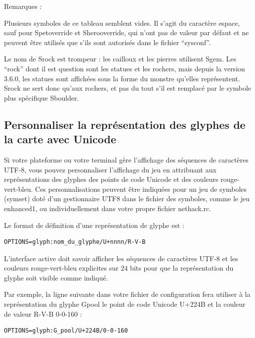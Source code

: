 \documentclass[titlepage]{article}
\begin{document}
Remarques :

Plusieurs symboles de ce tableau semblent vides.
Il s'agit du caractère espace, sauf pour S\textunderscore pet\textunderscore override
et S\textunderscore hero\textunderscore override, qui n'ont pas de valeur par défaut
et ne peuvent être utilisés que s'ils sont autorisés dans le fichier ``sysconf''.

Le nom de S\textunderscore rock est trompeur : les cailloux et les pierres utilisent S\textunderscore gem.
Les ``rock'' dont il est question sont les statues et les rochers, mais depuis
la version 3.6.0, les statues sont affichées sous la forme du monstre qu'elles représentent.
S\textunderscore rock ne sert donc qu'aux rochers, et pas du tout s'il est
remplacé par le symbole plus spécifique S\textunderscore boulder.

\subsection*{Personnaliser la représentation des glyphes de la carte avec Unicode}

Si votre plateforme ou votre terminal gère l'affichage des séquences de caractères
UTF-8, vous pouvez personnaliser l'affichage du jeu en attribuant aux représentations
des glyphes des points de code Unicode et des couleurs
rouge-vert-bleu. Ces personnalisations peuvent être indiquées pour un jeu de
symboles (symset) doté d'un gestionnaire UTF8 dans le fichier des symboles, comme le
jeu enhanced1, ou individuellement dans votre propre fichier nethack.rc.

Le format de définition d'une représentation de glyphe est :\\
\begin{verbatim}
OPTIONS=glyph:nom_du_glyphe/U+nnnn/R-V-B
\end{verbatim}

L'interface active doit savoir afficher les séquences de caractères UTF-8
et les couleurs rouge-vert-bleu explicites sur 24 bits pour que la représentation
du glyphe soit visible comme indiqué.

Par exemple, la ligne suivante dans votre fichier de configuration fera
utiliser à la représentation du glyphe G\textunderscore pool le point de code Unicode
U+224B et la couleur de valeur R-V-B 0-0-160 :\\
\begin{verbatim}
OPTIONS=glyph:G_pool/U+224B/0-0-160
\end{verbatim}
\end{document}

